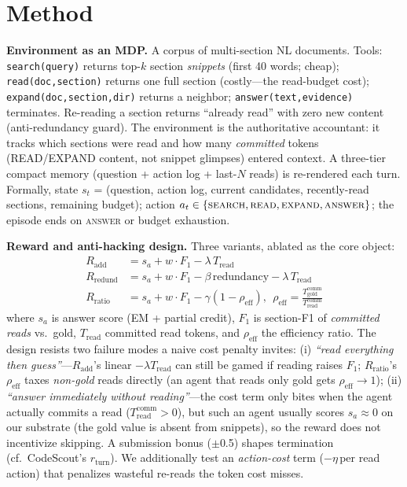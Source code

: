 \documentclass[10pt,twocolumn]{article}
\newcommand{\eff}{\mathrm{eff}}
\begin{document}
\section{Method}
\label{sec:method}
\textbf{Environment as an MDP.} A corpus of multi-section NL documents. Tools: \texttt{search(query)} returns top-$k$ section \emph{snippets} (first 40 words; cheap); \texttt{read(doc,section)} returns one full section (costly---the read-budget cost); \texttt{expand(doc,section,dir)} returns a neighbor; \texttt{answer(text,evidence)} terminates. Re-reading a section returns ``already read'' with zero new content (anti-redundancy guard). The environment is the authoritative accountant: it tracks which sections were read and how many \emph{committed} tokens (READ/EXPAND content, not snippet glimpses) entered context. A three-tier compact memory (question + action log + last-$N$ reads) is re-rendered each turn. Formally, state $s_t$ = (question, action log, current candidates, recently-read sections, remaining budget); action $a_t\in\{\textsc{search},\textsc{read},\textsc{expand},\textsc{answer}\}$; the episode ends on \textsc{answer} or budget exhaustion.

\textbf{Reward and anti-hacking design.} Three variants, ablated as the core object:
\begin{align*}
R_{\text{add}}   &= s_a + w{\cdot}F_1 - \lambda\,T_{\text{read}} \\
R_{\text{redund}}&= s_a + w{\cdot}F_1 - \beta\,\text{redundancy} - \lambda\,T_{\text{read}} \\
R_{\text{ratio}} &= s_a + w{\cdot}F_1 - \gamma(1 - \rho_{\eff}),\ \ \rho_{\eff}{=}\tfrac{T_{\text{gold}}^{\text{comm}}}{T_{\text{read}}^{\text{comm}}}
\end{align*}
where $s_a$ is answer score (EM + partial credit), $F_1$ is section-F1 of \emph{committed reads} vs.\ gold, $T_{\text{read}}$ committed read tokens, and $\rho_{\eff}$ the efficiency ratio. The design resists two failure modes a naive cost penalty invites: (i) \emph{``read everything then guess''}---$R_{\text{add}}$'s linear $-\lambda T_{\text{read}}$ can still be gamed if reading raises $F_1$; $R_{\text{ratio}}$'s $\rho_{\eff}$ taxes \emph{non-gold} reads directly (an agent that reads only gold gets $\rho_{\eff}{\to}1$); (ii) \emph{``answer immediately without reading''}---the cost term only bites when the agent actually commits a read ($T_{\text{read}}^{\text{comm}}>0$), but such an agent usually scores $s_a{\approx}0$ on our substrate (the gold value is absent from snippets), so the reward does not incentivize skipping. A submission bonus ($\pm$0.5) shapes termination (cf.\ CodeScout's $r_{\text{turn}}$). We additionally test an \emph{action-cost} term ($-\eta$\,per read action) that penalizes wasteful re-reads the token cost misses.
\end{document}
